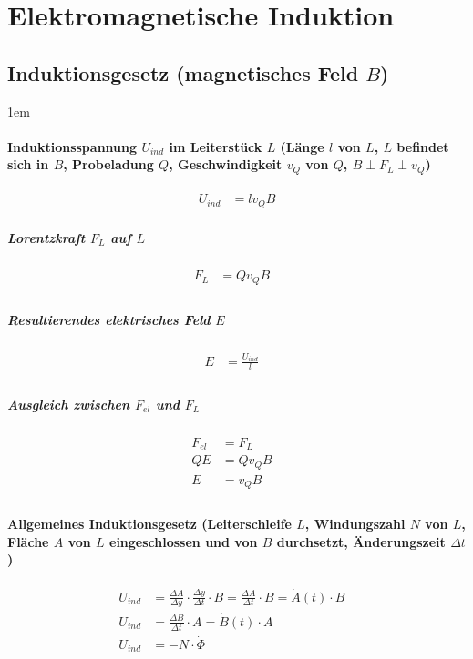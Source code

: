 \section{Elektromagnetische Induktion}

\subsection{Induktionsgesetz (magnetisches Feld $B$)}

\leftskip1em
\paragraph{Induktionsspannung $U_{ind}$ im Leiterstück $L$ (Länge $l$ von $L$, $L$ befindet sich in
$B$, Probeladung $Q$, Geschwindigkeit $v_Q$ von $Q$, $B \perp F_L \perp v_Q$)}

\begin{align*}
  U_{ind} &= l v_Q B
\end{align*}

\subparagraph{Lorentzkraft $F_L$ auf $L$}

\begin{align*}
  F_L &= Q v_Q B &\\
\end{align*}

\subparagraph{Resultierendes elektrisches Feld $E$}

\begin{align*}
  E &= \frac{U_{ind}}{l} &\\
\end{align*}

\subparagraph{Ausgleich zwischen $F_{el}$ und $F_L$}

\begin{align*}
  F_{el} &= F_L &\\
  Q E &= Q v_Q B &\\
  E &= v_Q B &\\
\end{align*}

\paragraph{Allgemeines Induktionsgesetz (Leiterschleife $L$, Windungszahl $N$ von $L$, Fläche $A$
von $L$ eingeschlossen und von $B$ durchsetzt, Änderungszeit $\Delta t$)}

\begin{align*}
  U_{ind} &= \frac{\Delta A}{\Delta y} \cdot \frac{\Delta y}{\Delta t} \cdot B = \frac{\Delta
  A}{\Delta t} \cdot B = \dot{A} \left( t \right) \cdot B &\\
  U_{ind} &= \frac{\Delta B}{\Delta t} \cdot A = \dot{B} \left( t \right) \cdot A &\\
  U_{ind} &= -N \cdot \dot{\Phi} &\\
\end{align*}

